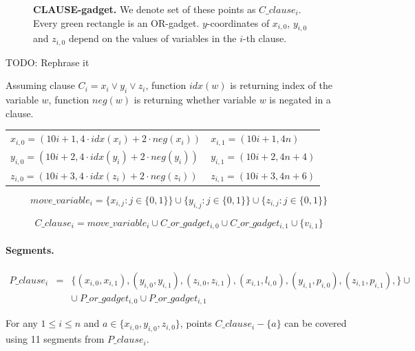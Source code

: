 \begin{figure}[h]
\centering
\def\svgwidth{0.8\columnwidth}

\caption{\textbf{CLAUSE-gadget.}
We denote set of these points as $C\_clause_i$.
Every green rectangle is an OR-gadget.
$y$-coordinates of $x_{i, 0}$, $y_{i, 0}$ and $z_{i,0}$
depend on the values of variables in the $i$-th clause.
}
\label{fig:apx_clause}
\end{figure}

TODO: Rephrase it

Assuming clause $C_i = x_i \lor y_i \lor z_i$,
function $idx(w)$ is returning index of the variable $w$,
function $neg(w)$ is returning whether variable $w$ is negated
in a clause.

\begin{center}
\begin{tabular}{ l l }
	$x_{i, 0} = (10i+1, 4\cdot idx(x_i) + 2\cdot neg(x_i))$ &
	$x_{i, 1} = (10i+1, 4n)$ \\
	$y_{i, 0} = (10i+2, 4\cdot idx(y_i) + 2\cdot neg(y_i))$ &
	$y_{i, 1} = (10i+2, 4n + 4)$ \\
	$z_{i, 0} = (10i+3, 4\cdot idx(z_i) + 2\cdot neg(z_i))$ &
	$z_{i, 1} = (10i+3, 4n + 6)$
\end{tabular}
\end{center}
	
 
 $$move\_variable_i = 
 \{x_{i, j} : j \in \{0, 1\}\} \cup
 \{y_{i, j} : j \in \{0, 1\}\} \cup
 \{z_{i, j} : j \in \{0, 1\}\} 
 $$
 
 $$C\_clause_i = 
 move\_variable_i \cup C\_or\_gadget_{i, 0}
 \cup C\_or\_gadget_{i, 1} \cup \{v_{i, 1} \} 
 $$

\paragraph{Segments.}

\begin{eqnarray*}
P\_clause_i & = & \{ (x_{i, 0}, x_{i, 1}),
(y_{i, 0}, y_{i, 1}),
(z_{i, 0}, z_{i, 1}),
(x_{i, 1}, l_{i, 0}),
(y_{i, 1}, p_{i, 0}),
(z_{i, 1}, p_{i, 1}),
\} \cup \\
& & \cup \ P\_or\_gadget_{i, 0} \cup P\_or\_gadget_{i, 1}
\end{eqnarray*}

\begin{lemma}
\label{cover_clauses_solution_true}
For any $1 \le i \le n$ and $a \in \{ x_{i, 0}, y_{i, 0}, z_{i, 0}\}$,
points $C\_clause_i - \{a\}$ can be covered using 11 segments
from $P\_clause_i$.
\end{lemma}

